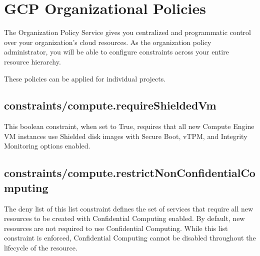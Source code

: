 
\section*{GCP Organizational Policies}


The Organization Policy Service gives you 
centralized and programmatic control over your organization's cloud resources. 
As the organization policy administrator, 
you will be able to configure constraints across your entire resource hierarchy. 

These policies can be applied for individual projects.

\subsection*{constraints/compute.requireShieldedVm}
This boolean constraint, when set to True, 
requires that all new Compute Engine VM instances use Shielded disk images 
with Secure Boot, vTPM, and Integrity Monitoring options enabled.

\subsection*{constraints/compute.restrictNonConfidentialComputing}
The deny list of this list constraint defines the set of services 
that require all new resources to be created with Confidential Computing enabled.
By default, new resources are not required to use Confidential Computing. 
While this list constraint is enforced, 
Confidential Computing cannot be disabled 
throughout the lifecycle of the resource.
